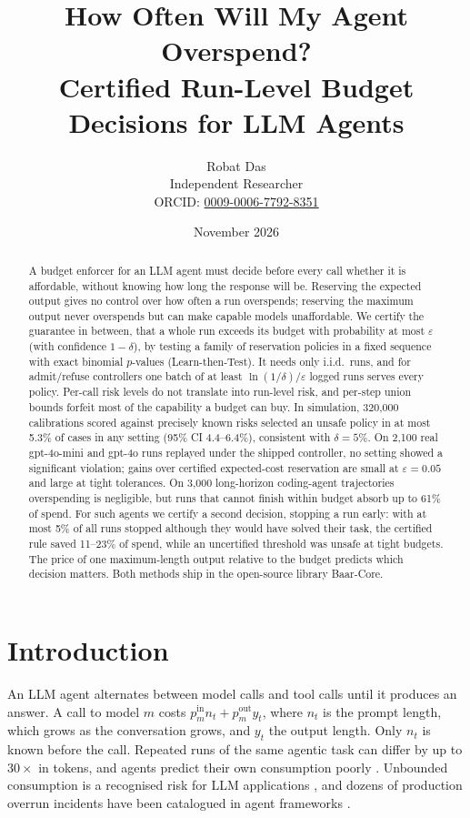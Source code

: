 \documentclass[11pt]{article}
\title{How Often Will My Agent Overspend?\\
Certified Run-Level Budget Decisions for LLM Agents}
\author{Robat Das\\
Independent Researcher\\
ORCID: \href{https://orcid.org/0009-0006-7792-8351}{0009-0006-7792-8351}}
\date{November 2026}
\theoremstyle{remark}
\begin{document}
\maketitle

\begin{abstract}
A budget enforcer for an LLM agent must decide before every call whether it is
affordable, without knowing how long the response will be. Reserving the
expected output gives no control over how often a run overspends; reserving the
maximum output never overspends but can make capable models unaffordable. We
certify the guarantee in between, that a whole run exceeds its budget with
probability at most $\varepsilon$ (with confidence $1-\delta$), by testing a
family of reservation policies in a fixed sequence with exact binomial
$p$-values (Learn-then-Test). It needs only i.i.d.\ runs, and for admit/refuse
controllers one batch of at least $\ln(1/\delta)/\varepsilon$ logged runs serves
every policy. Per-call risk levels do not translate into run-level risk, and
per-step union bounds forfeit most of the capability a budget can buy. In
simulation, 320{,}000 calibrations scored against precisely known risks selected
an unsafe policy in at most 5.3\% of cases in any setting (95\% CI 4.4--6.4\%),
consistent with $\delta = 5\%$. On 2{,}100 real gpt-4o-mini and gpt-4o runs
replayed under the shipped controller, no setting showed a significant
violation; gains over certified expected-cost reservation are small at
$\varepsilon = 0.05$ and large at tight tolerances. On 3{,}000 long-horizon
coding-agent trajectories overspending is negligible, but runs that cannot finish
within budget absorb up to 61\% of spend. For such agents we certify a second
decision, stopping a run early: with at most 5\% of all runs stopped although
they would have solved their task, the certified rule saved 11--23\% of spend,
while an uncertified threshold was unsafe at tight budgets. The price of one
maximum-length output relative to the budget predicts which decision matters.
Both methods ship in the open-source library Baar-Core.
\end{abstract}

\section{Introduction}

An LLM agent alternates between model calls and tool calls until it produces an
answer. A call to model $m$ costs $p^{\text{in}}_m n_t + p^{\text{out}}_m y_t$,
where $n_t$ is the prompt length, which grows as the conversation grows, and
$y_t$ the output length. Only $n_t$ is known before the call. Repeated runs of
the same agentic task can differ by up to $30\times$ in tokens, and agents
predict their own consumption poorly \citep{bai2026spend,lin2026bagen}.
Unbounded consumption is a recognised risk for LLM applications
\citep{owasp2025llm10}, and dozens of production overrun incidents have been
catalogued in agent frameworks \citep{khan2026tokenbudgets}.
\end{document}
